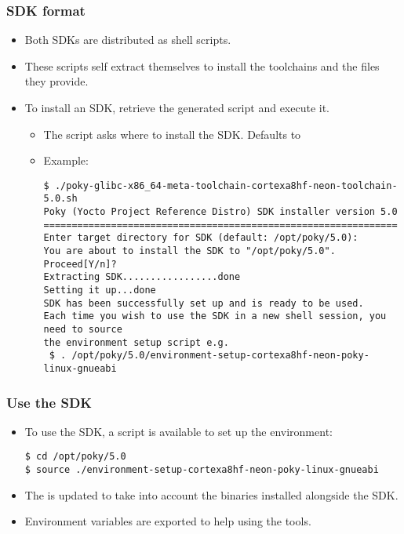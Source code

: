 \begin{frame}[fragile]
  \frametitle{SDK format}
  \begin{itemize}
    \item Both SDKs are distributed as shell scripts.
    \item These scripts self extract themselves to install the
      toolchains and the files they provide.
    \item To install an SDK, retrieve the generated script and execute
      it.
      \begin{itemize}
        \item The script asks where to install the SDK. Defaults to
        \item Example: 
        \begin{block}{}
          \begin{verbatim}
$ ./poky-glibc-x86_64-meta-toolchain-cortexa8hf-neon-toolchain-5.0.sh
Poky (Yocto Project Reference Distro) SDK installer version 5.0
===============================================================
Enter target directory for SDK (default: /opt/poky/5.0):
You are about to install the SDK to "/opt/poky/5.0". Proceed[Y/n]?
Extracting SDK.................done
Setting it up...done
SDK has been successfully set up and is ready to be used.
Each time you wish to use the SDK in a new shell session, you need to source
the environment setup script e.g.
 $ . /opt/poky/5.0/environment-setup-cortexa8hf-neon-poky-linux-gnueabi
          \end{verbatim}
        \end{block}
      \end{itemize}
  \end{itemize}
\end{frame}

\begin{frame}[fragile]
  \frametitle{Use the SDK}
  \begin{itemize}
    \item To use the SDK, a script is available to set up the
      environment:
      \begin{block}{}
        \begin{verbatim}
$ cd /opt/poky/5.0
$ source ./environment-setup-cortexa8hf-neon-poky-linux-gnueabi
        \end{verbatim}
      \end{block}
    \item The  is updated to take into account the binaries
      installed alongside the SDK.
    \item Environment variables are exported to help using the tools.
  \end{itemize}
\end{frame}

